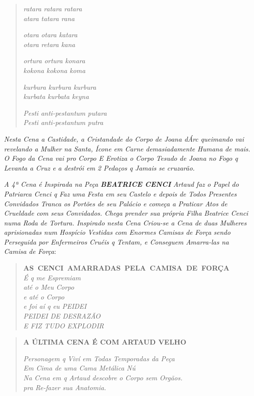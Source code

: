 \pagebreak
\mbox{}\vspace*{\fill}
\begin{verse}
\emph{ratara ratara ratara}\\
\emph{atara tatara rana}

\emph{otara otara katara}\\
\emph{otara retara kana}

\emph{ortura ortura konara}\\
\emph{kokona kokona koma}

\emph{kurbura kurbura kurbura}\\
\emph{kurbata kurbata keyna}

\emph{Pesti anti-pestantum putara}\\
\emph{Pesti anti-pestantum putra}
\end{verse}
\mbox{}\vspace*{\fill}
\pagebreak

\emph{Nesta Cena a Castidade, a Cristandade do Corpo de Joana dÁrc
queimando vai revelando a Mulher na Santa, Ícone em Carne demasiadamente
Humana de mais. O Fogo da Cena vai pro Corpo E Erotiza o Corpo Tesudo de
Joana no Fogo q Levanta a Cruz e a destrói em 2 Pedaços q Jamais se
cruzarão.}

\emph{A 4ª Cena é Inspirada na Peça \textbf{BEATRICE CENCI} Artaud faz o
Papel do Patriarca Cenci q Faz uma Festa em seu Castelo e depois de
Todos Presentes Convidados Tranca os Portões de seu Palácio e começa a
Praticar Atos de Crueldade com seus Convidados. Chega prender sua
própria Filha Beatrice Cenci numa Roda de Tortura. Inspirado nesta Cena
Criou-se a Cena de duas Mulheres aprisionadas num Hospício Vestidas com
Enormes Camisas de Força sendo Perseguida por Enfermeiros Cruéis q
Tentam, e Conseguem Amarra-las na Camisa de Força}:

\begin{verse}
\textbf{AS~CENCI~AMARRADAS~PELA~CAMISA~DE~FORÇA}\\
\emph{É q me Espremiam}\\
\emph{até o Meu Corpo}\\
\emph{e até o Corpo}\\ \EP[2]
\emph{e foi aí q eu PEIDEI}\\
\emph{PEIDEI DE DESRAZÃO}\\
\emph{E FIZ TUDO EXPLODIR}
\end{verse}

\begin{verse}
\textbf{A ÚLTIMA CENA É COM ARTAUD VELHO}

\emph{Personagem q Viví em Todas Temporadas da Peça}\\
\emph{Em Cima de uma Cama Metálica Nú}\\
\emph{Na Cena em q Artaud descobre o Corpo sem Orgãos.}\\
\emph{pra Re-fazer sua Anatomia.}
\end{verse}

